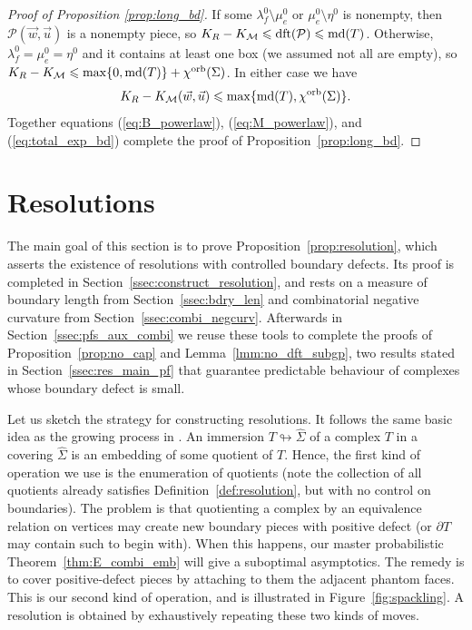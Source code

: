 \documentclass{amsart}
\newcommand{\cho}{\chi^{\textnormal{orb}}}
\newcommand{\dft}{\textnormal{dft}}
\newcommand{\md}{\textnormal{md}}
\newcommand{\whS}{{\widehat{\Sigma}}}
\begin{document}
\begin{proof}[Proof of Proposition \ref{prop:long_bd}]
If some $\lambda_f^0\setminus\mu^0_e$ or $\mu^0_e\setminus\eta^0$ is nonempty, then $\mathcal{P}(\vec{w},\vec{u})$ is a nonempty piece, so $K_R-K_\mathcal{M}\leqslant\dft(\mathcal{P})\leqslant\md(T)$. Otherwise, $\lambda^0_f=\mu^0_e=\eta^0$ and it contains at least one box (we assumed not all are empty), so $K_R-K_\mathcal{M}\leqslant\max\{0,\md(T)\}+\cho(\Sigma)$. In either case we have
\begin{equation}\label{eq:total_exp_bd}
K_R-K_\mathcal{M}(\vec{w},\vec{u})\leqslant\max\{\md(T),\cho(\Sigma)\}.
\end{equation}
Together equations (\ref{eq:B_powerlaw}), (\ref{eq:M_powerlaw}), and (\ref{eq:total_exp_bd}) complete the proof of Proposition~\ref{prop:long_bd}.
\end{proof}

\section{Resolutions}\label{sec:resolutions}

The main goal of this section is to prove Proposition~\ref{prop:resolution}, which asserts the existence of resolutions with controlled boundary defects. Its proof is completed in Section~\ref{ssec:construct_resolution}, and rests on a measure of boundary length from Section~\ref{ssec:bdry_len} and combinatorial negative curvature from Section~\ref{ssec:combi_negcurv}. Afterwards in Section~\ref{ssec:pfs_aux_combi} we reuse these tools to complete the proofs of Proposition~\ref{prop:no_cap} and Lemma~\ref{lmm:no_dft_subgp}, two results stated in Section~\ref{ssec:res_main_pf} that guarantee predictable behaviour of complexes whose boundary defect is small.

Let us sketch the strategy for constructing resolutions. It follows the same basic idea as the growing process in \cite[Definition 2.10]{asymptotic_stats_random_covering_surfaces_MageePuder23}. An immersion $T\looparrowright\whS$ of a complex $T$ in a covering $\whS$ is an embedding of some quotient of $T$. Hence, the first kind of operation we use is the enumeration of quotients (note the collection of all quotients already satisfies Definition~\ref{def:resolution}, but with no control on boundaries). The problem is that quotienting a complex by an equivalence relation on vertices may create new boundary pieces with positive defect (or $\partial T$ may contain such to begin with). When this happens, our master probabilistic Theorem~\ref{thm:E_combi_emb} will give a suboptimal asymptotics. The remedy is to cover positive-defect pieces by attaching to them the adjacent phantom faces. This is our second kind of operation, and is illustrated in Figure~\ref{fig:spackling}. A resolution is obtained by exhaustively repeating these two kinds of moves.
\end{document}
